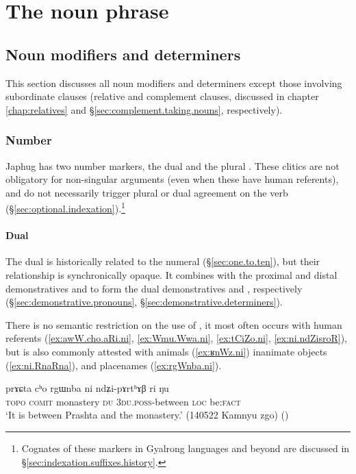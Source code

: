 \chapter{The noun phrase} \label{chap:noun.phrase}


\section{Noun modifiers and determiners} \label{sec:determiners}
This section discusses all noun modifiers and determiners except those involving subordinate clauses (relative and complement clauses, discussed in chapter \ref{chap:relatives} and §\ref{sec:complement.taking.nouns}, respectively). 
 
\subsection{Number}  \label{sec:number.determiners}
Japhug has two number markers, the dual  and the plural . These clitics are not obligatory for non-singular arguments (even when these have human referents), and do not necessarily trigger plural or dual agreement on the verb (§\ref{sec:optional.indexation}).\footnote{Cognates of these markers in Gyalrong languages and beyond are discussed in §\ref{sec:indexation.suffixes.history}. }

\subsubsection{Dual} \label{sec:dual.determiners}
The dual  is historically related to the numeral  (§\ref{sec:one.to.ten}), but their relationship is synchronically opaque. It combines with the proximal and distal demonstratives  and  to form the dual demonstratives  and , respectively (§\ref{sec:demonstrative.pronouns}, §\ref{sec:demonstrative.determiners}).

There is no semantic restriction on the use of , it most often occurs with human referents (\ref{ex:awW.cho.aRi.ni}, \ref{ex:Wmu.Wwa.ni}, \ref{ex:tCiZo.ni}, \ref{ex:ni.ndZisroR}), but is also commonly attested with animals (\ref{ex:ʁnWz.ni}) inanimate objects (\ref{ex:ni.RnaRna}), and placenames (\ref{ex:rgWnba.ni}). 

\begin{exe}
\ex \label{ex:rgWnba.ni}
\gll prɤɕta cʰo rgɯnba ni ndʑi-pɤrtʰɤβ ri ŋu \\
\textsc{topo} \textsc{comit} monastery \textsc{du} \textsc{3du}.\textsc{poss}-between \textsc{loc} be:\textsc{fact} \\
\glt `It is between Prashta and the monastery.' (140522 Kamnyu zgo)
()
\end{exe}

